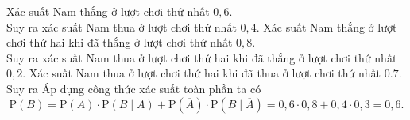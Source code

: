 \begin{ex}
{			\begin{itemchoice}
			\itemch Xác suất Nam thắng ở lượt chơi thứ nhất $0{,}6$.\\
			Suy ra xác suất Nam thua ở lượt chơi thứ nhất $0{,}4$.
				\itemch  Xác suất Nam thắng ở lượt chơi thứ hai khi đã thắng ở lượt chơi thứ nhất $0{,}8$.\\
				Suy ra  xác suất Nam thua ở lượt chơi thứ hai khi đã thắng ở lượt chơi thứ nhất $0{,}2$.
					\itemch  Xác suất Nam thua ở lượt chơi thứ hai khi đã thua ở lượt chơi thứ nhất $0.7$.\\
					Suy ra 
		\itemch
			Áp dụng công thức xác suất toàn phần ta có	$$\mathrm{P}(B)=\mathrm{P}(A)\cdot \mathrm{P}(B \mid A)+\mathrm{P}(\overline{A}) \cdot \mathrm{P}(B \mid \overline{A}) 
		=0{,}6\cdot 0{,}8 +0{,}4 \cdot 0{,}3=0{,}6.$$
	
				\end{itemchoice}
	}
\end{ex}

